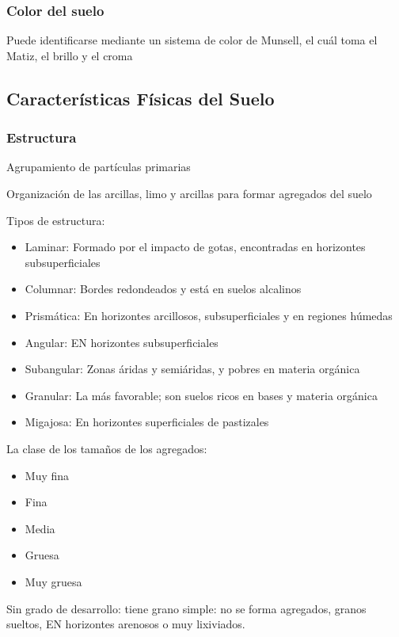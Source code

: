 \subsubsection{Color del suelo}
Puede identificarse mediante un sistema de color de Munsell, el cuál toma el Matiz, el brillo y el croma\subsection{Características Físicas del Suelo}\subsubsection{Estructura}
\begin{definition}[Agregado]
    Agrupamiento de partículas primarias
\end{definition}
\begin{definition}[Estructura]
    Organización de las arcillas, limo y arcillas para formar agregados del suelo
\end{definition}
Tipos de estructura:
\begin{itemize}
    \item Laminar: Formado por el impacto de gotas, encontradas en horizontes subsuperficiales
    \item Columnar: Bordes redondeados y está en suelos alcalinos
    \item Prismática: En horizontes arcillosos, subsuperficiales y en regiones húmedas
    \item Angular: EN horizontes subsuperficiales
    \item Subangular: Zonas áridas y semiáridas, y pobres en materia orgánica
    \item Granular: La más favorable; son suelos ricos en bases y materia orgánica
    \item Migajosa: En horizontes superficiales de pastizales
\end{itemize}

La clase de los tamaños de los agregados:
\begin{itemize}
    \item Muy fina
    \item Fina
    \item Media
    \item Gruesa
    \item Muy gruesa
\end{itemize}
Sin grado de desarrollo: tiene grano simple: no se forma agregados, granos sueltos, EN horizontes arenosos o muy lixiviados.

